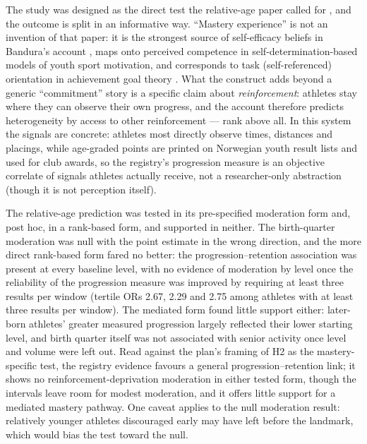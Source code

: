 \documentclass[12pt,a4paper]{article}
\begin{document}
The study was designed as the direct test the relative-age paper called for \cite{guttormsen2026rae}, and the outcome is split in an informative way. ``Mastery experience'' is not an invention of that paper: it is the strongest source of self-efficacy beliefs in Bandura's account \cite{bandura1977}, maps onto perceived competence in self-determination-based models of youth sport motivation, and corresponds to task (self-referenced) orientation in achievement goal theory \cite{nicholls1984}. What the construct adds beyond a generic ``commitment'' story is a specific claim about \emph{reinforcement}: athletes stay where they can observe their own progress, and the account therefore predicts heterogeneity by access to other reinforcement --- rank above all. In this system the signals are concrete: athletes most directly observe times, distances and placings, while age-graded points are printed on Norwegian youth result lists and used for club awards, so the registry's progression measure is an objective correlate of signals athletes actually receive, not a researcher-only abstraction (though it is not perception itself).

The relative-age prediction was tested in its pre-specified moderation form and, post hoc, in a rank-based form, and supported in neither. The birth-quarter moderation was null with the point estimate in the wrong direction, and the more direct rank-based form fared no better: the progression--retention association was present at every baseline level, with no evidence of moderation by level once the reliability of the progression measure was improved by requiring at least three results per window (tertile ORs 2.67, 2.29 and 2.75 among athletes with at least three results per window). The mediated form found little support either: later-born athletes' greater measured progression largely reflected their lower starting level, and birth quarter itself was not associated with senior activity once level and volume were left out. Read against the plan's framing of H2 as the mastery-specific test, the registry evidence favours a general progression--retention link; it shows no reinforcement-deprivation moderation in either tested form, though the intervals leave room for modest moderation, and it offers little support for a mediated mastery pathway. One caveat applies to the null moderation result: relatively younger athletes discouraged early may have left before the landmark, which would bias the test toward the null.
\end{document}
